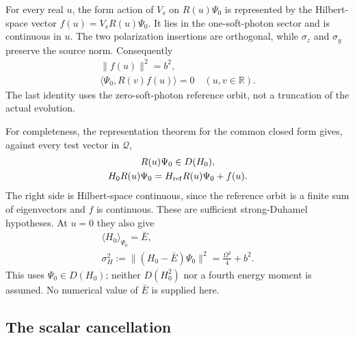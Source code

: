 For every real $u$, the form action of $V_s$ on $R(u)\Psi_0$ is represented
by the Hilbert-space vector
$f(u)=V_sR(u)\Psi_0$. It lies in the one-soft-photon sector and is
continuous in $u$. The two polarization insertions are orthogonal, while
$\sigma_z$ and $\sigma_y$ preserve the source norm. Consequently
\begin{equation}
\begin{gathered}
\|f(u)\|^2=b^2,
 \\
 \langle\Psi_0,R(v)f(u)\rangle=0
 \quad(u,v\in\mathbb R).
\end{gathered}
\label{eq:chvi-foundation-forcing-orthogonality}
\end{equation}
The last identity uses the zero-soft-photon reference orbit, not a
truncation of the actual evolution.

For completeness, the representation theorem for the common closed form
gives, against every test vector in $\mathcal Q$,
\begin{equation}
\begin{gathered}
R(u)\Psi_0\in D(H_0),\\
 H_0R(u)\Psi_0=H_{\rm ref}R(u)\Psi_0+f(u).
\end{gathered}
\label{eq:chvi-foundation-domain}
\end{equation}
The right side is Hilbert-space continuous, since the reference orbit is
a finite sum of eigenvectors and $f$ is continuous. These are sufficient
strong-Duhamel hypotheses. At $u=0$ they also give
\begin{equation}
\begin{gathered}
\langle H_0\rangle_{\Psi_0}=\bar E,\\
 \sigma_H^2:=\|(H_0-\bar E)\Psi_0\|^2
       =\frac{\Omega^2}{4}+b^2.
\end{gathered}
\label{eq:chvi-foundation-variance}
\end{equation}
This uses $\Psi_0\in D(H_0)$; neither $D(H_0^2)$ nor a fourth energy
moment is assumed. No numerical value of $\bar E$ is supplied here.

\subsection{The scalar cancellation}

